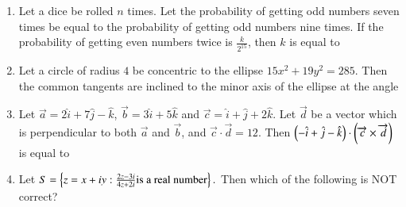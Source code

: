 \documentclass[journal]{IEEEtran}
\begin{document}
\begin{enumerate}[start = 16]
\item Let a dice be rolled $n$ times. Let the probability of getting odd numbers seven times be equal to the probability of getting odd numbers nine times. If the probability of getting even numbers twice is $\frac{k}{2^{15}}$, then $k$ is equal to
	\begin{enumerate}
	\begin{multicols}{4}
		\item $60$ 
		\item $30$
		\item $90$
		\item $15$
		\end{multicols}
	\end{enumerate}
\item Let a circle of radius $4$ be concentric to the ellipse $15x^2 + 19y^2 = 285.$ Then the common tangents are inclined
to the minor axis of the ellipse at the angle
	\begin{enumerate}
	\begin{multicols}{4}
		\item $\frac{\pi}{6}$
		\item $\frac{\pi}{12}$
		\item $\frac{\pi}{3}$
		\item $\frac{\pi}{4}$
	\end{multicols}
	\end{enumerate}
\item Let $\overrightarrow{a} = 2\hat{i} + 7\hat{j} - \hat{k}$, $\overrightarrow{b} = 3\hat{i} + 5\hat{k}$ and $\overrightarrow{c} = \hat{i} + \hat{j} + 2\hat{k}$. Let $\overrightarrow{d}$ be a vector which is perpendicular to both $\overrightarrow{a}$ and $\overrightarrow{b}$, and $\overrightarrow{c}\cdot\overrightarrow{d} = 12$. Then $\left(-\hat{i} + \hat{j} - \hat{k}\right)\cdot\left(\overrightarrow{c}\times\overrightarrow{d}\right)$is equal to	
	\begin{enumerate}
	\end{enumerate}
\item Let $S = \left\{z = x + iy : \frac{2z-3i}{4z+2i} \text{is a real number}\right\}.$ Then which of the following is NOT correct?

\end{enumerate}
\end{document}
